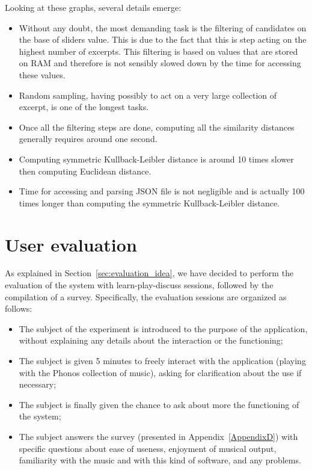 Looking at these graphs, several details emerge:
\begin{itemize}
\item Without any doubt, the most demanding task is the filtering of candidates on the base of sliders value. This is due to the fact that this is step acting on the highest number of excerpts. This filtering is based on values that are stored on RAM and therefore is not sensibly slowed down by the time for accessing these values. 
\item Random sampling, having possibly to act on a very large collection of excerpt, is one of the longest tasks.
\item Once all the filtering steps are done, computing all the similarity distances generally requires around one second. 
\item Computing symmetric Kullback-Leibler distance is around 10 times slower then computing Euclidean distance.
\item Time for accessing and parsing JSON file is not negligible and is actually 100 times longer than computing the symmetric Kullback-Leibler distance.
\end{itemize}

\section{User evaluation}
\label{sec:eval_results}
As explained in Section~\ref{sec:evaluation_idea}, we have decided to perform the evaluation of the system with learn-play-discuss sessions, followed by the compilation of a survey.
Specifically, the evaluation sessions are organized as follows:
\begin{itemize}
\item The subject of the experiment is introduced to the purpose of the application, without explaining any details about the interaction or the functioning;
\item The subject is given 5 minutes to freely interact with the application (playing with the Phonos collection of music), asking for clarification about the use if necessary;
\item The subject is finally given the chance to ask about more the functioning of the system;
\item The subject answers the survey (presented in Appendix~\ref{AppendixD}) with specific questions about ease of useness, enjoyment of musical output, familiarity with the music and with this kind of software, and any problems. 
\end{itemize}

